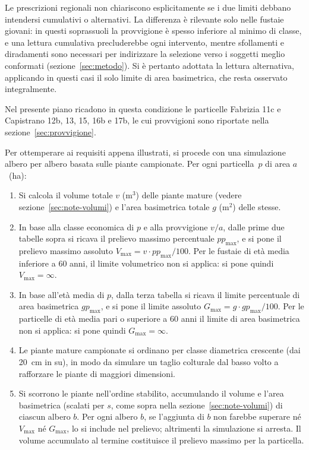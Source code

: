 \documentclass[a4paper,11pt]{article}
\begin{document}
Le prescrizioni regionali non chiariscono esplicitamente se i due limiti debbano
intendersi cumulativi o alternativi. La differenza è rilevante solo nelle
fustaie giovani: in questi soprassuoli la provvigione è spesso inferiore al
minimo di classe, e una lettura cumulativa precluderebbe ogni intervento, mentre
sfollamenti e diradamenti sono necessari per indirizzare la selezione verso i
soggetti meglio conformati (sezione~\ref{sec:metodo}). Si è pertanto adottata la
lettura alternativa, applicando in questi casi il solo limite di area
basimetrica, che resta osservato integralmente.

Nel presente piano ricadono in questa condizione le particelle Fabrizia 11c e
Capistrano 12b, 13, 15, 16b e 17b, le cui provvigioni sono riportate nella
sezione~\ref{sec:provvigione}.

Per ottemperare ai requisiti appena illustrati, si procede con una simulazione
albero per albero basata sulle piante campionate. Per ogni particella~$p$ di
area $a$~(ha):

\begin{enumerate}
\item Si calcola il volume totale $v$ (m$^3$) delle piante mature (vedere
sezione~\ref{sec:note-volumi}) e l'area basimetrica totale $g$ (m$^2$) delle
stesse.

\item In base alla classe economica di $p$ e alla provvigione $v/a$, dalle prime
due tabelle sopra si ricava il prelievo massimo percentuale $pp_{\max}$, e si
pone il prelievo massimo assoluto $V_{\max} = v \cdot pp_{\max}/100$. Per le
fustaie di età media inferiore a 60 anni, il limite volumetrico non si applica:
si pone quindi $V_{\max} = \infty$.

\item In base all'età media di $p$, dalla terza tabella si ricava il limite
percentuale di area basimetrica $gp_{\max}$, e si pone il limite assoluto
$G_{\max} = g \cdot gp_{\max}/100$. Per le particelle di età media pari o
superiore a 60 anni il limite di area basimetrica non si applica: si pone quindi
$G_{\max} = \infty$.

\item Le piante mature campionate si ordinano per classe diametrica crescente
(dai 20~cm in su), in modo da simulare un taglio colturale dal basso volto a
rafforzare le piante di maggiori dimensioni.

\item Si scorrono le piante nell'ordine stabilito, accumulando il volume e
l'area basimetrica (scalati per $s$, come sopra nella
sezione~\ref{sec:note-volumi}) di ciascun albero $b$. Per ogni albero $b$, se
l'aggiunta di $b$ non farebbe superare né $V_{\max}$ né $G_{\max}$, lo si
include nel prelievo; altrimenti la simulazione si arresta. Il volume accumulato
al termine costituisce il prelievo massimo per la particella.
\end{enumerate}
\end{document}
